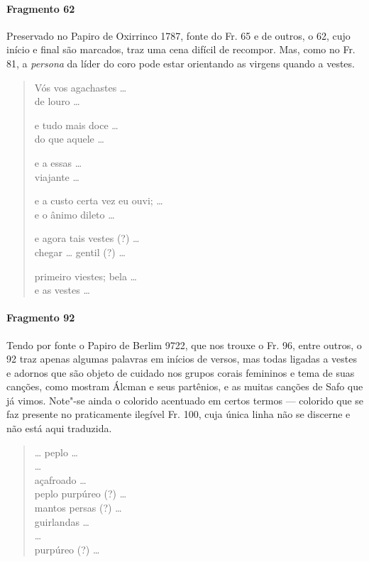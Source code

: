 {\paragraph{Fragmento 62}

{\small Preservado no Papiro de Oxirrinco 1787, fonte do Fr. 65 e de outros, o 62, cujo início e final são marcados, traz uma cena difícil de recompor. Mas, como no Fr. 81, a \textit{persona} da líder do coro pode estar orientando as virgens quando a vestes.}

\begin{verse}
Vós vos agachastes \ldots{}\\
de louro \ldots{}

e tudo mais doce \ldots{}\\
do que aquele \ldots{}

e a essas \ldots{}\\
viajante \ldots{}

e a custo certa vez eu ouvi; \ldots{}\\
e o ânimo dileto \ldots{}

e agora tais vestes (?) \ldots{}\\
chegar \ldots{} gentil (?) \ldots{}

primeiro viestes; bela \ldots{}\\
e as vestes \ldots{}
\end{verse}

\paragraph{Fragmento 92}

{\small Tendo por fonte o Papiro de Berlim 9722, que nos trouxe o Fr. 96, entre outros, o 92 traz apenas algumas palavras em inícios de versos, mas todas ligadas a vestes e adornos que são objeto de cuidado nos grupos corais femininos e tema de suas canções, como mostram Álcman e seus partênios, e as muitas canções de Safo que já vimos. Note"-se ainda o colorido acentuado em certos termos --- colorido que se faz presente no praticamente ilegível Fr. 100, cuja única linha não se discerne e não está aqui traduzida.}

\begin{verse}
\ldots{} peplo \ldots{}\\
\ldots{}\\
açafroado \ldots{}\\
peplo purpúreo (?) \ldots{}\\
mantos persas (?) \ldots{}\\
guirlandas \ldots{}\\
\ldots{}\\
purpúreo (?) \ldots{}
\end{verse}


}
